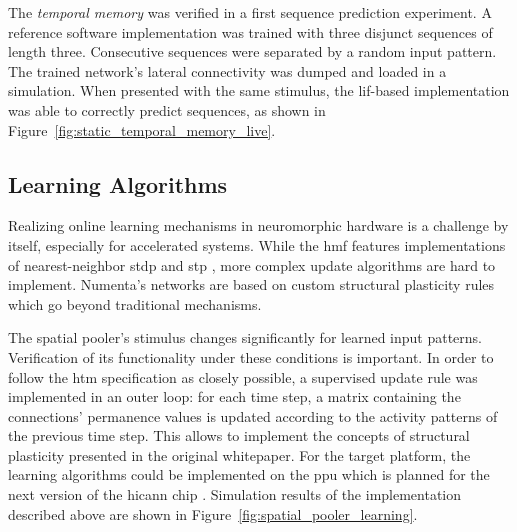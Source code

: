 
The \emph{temporal memory} was verified in a first sequence prediction
experiment. A reference software implementation was trained with three disjunct
sequences of length three. Consecutive sequences were separated by a random
input pattern. The trained network's lateral connectivity was dumped and loaded
in a simulation. When presented with the same stimulus, the \gls{lif}-based
implementation was able to correctly predict sequences, as shown in
Figure~\ref{fig:static_temporal_memory_live}.

\begin{figure*}[p]
	\begin{center}
		
	\end{center}
	\caption{A \gls{lif} neuron based temporal memory implementation correctly predicting different patterns. Predicted cells are marked blue, active cells in purple. The network spans 128 columns with each of their eight \gls{htm} cells collecting distal stimuli via two dendritic segments. Connectivity for the distal inputs was configured externally. The model was presented three disjunct sequences of size three. The individual patterns were separated by a random input \gls{sdr}.}
	\label{fig:static_temporal_memory_live}
\end{figure*}

\subsection{Learning Algorithms}

Realizing online learning mechanisms in neuromorphic hardware is a challenge by itself, especially for accelerated systems. While the \gls{hmf} features implementations of nearest-neighbor \gls{stdp} and \gls{stp} \citep{friedmann13plasticity,billaudelle14stp}, more complex update algorithms are hard to implement. Numenta's networks are based on custom structural plasticity rules which go beyond traditional mechanisms.

The spatial pooler's stimulus changes significantly for learned input patterns.
Verification of its functionality under these conditions is important. In order
to follow the \gls{htm} specification as closely possible, a supervised update
rule was implemented in an outer loop: for each time step, a matrix containing
the connections' permanence values is updated according to the activity patterns
of the previous time step. This allows to implement the concepts of structural
plasticity presented in the original whitepaper. For the target platform, the
learning algorithms could be implemented on the \gls{ppu} which is planned for
the next version of the \gls{hicann} chip \citep{friedmann2013phd}. Simulation
results of the implementation described above are shown in
Figure~\ref{fig:spatial_pooler_learning}.

